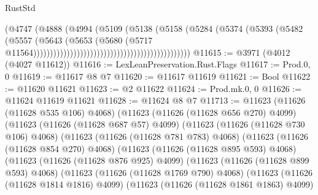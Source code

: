\begin{lexlean}{RustStd}
\begin{coremodule}
                                                                    (@4747
                                                                      (@4888
                                                                        (@4994
                                                                          (@5109
                                                                            (@5138
                                                                              (@5158
                                                                                (@5284
                                                                                  (@5374
                                                                                    (@5393
                                                                                      (@5482
                                                                                        (@5557
                                                                                          (@5643
                                                                                            (@5653
                                                                                              (@5680
                                                                                                (@5717
                                                                                                  @11564)))))))))))))))))))))))))))))))))))))))))))))))
@11615 := @3971 (@4012 (@4027 @11612))
@11616 := LexLeanPreservation.Rust.Flags
@11617 := Prod.{0, 0}
@11619 := @11617 @8 @7
@11620 := @11617 @11619
@11621 := Bool
@11622 := @11620 @11621
@11623 := @2 @11622
@11624 := Prod.mk.{0, 0}
@11626 := @11624 @11619 @11621
@11628 := @11624 @8 @7
@11713 := @11623
    (@11626 (@11628 @535 @106) @4068)
    (@11623
      (@11626 (@11628 @656 @270) @4099)
      (@11623
        (@11626 (@11628 @687 @57) @4099)
        (@11623
          (@11626 (@11628 @730 @106) @4068)
          (@11623
            (@11626 (@11628 @781 @783) @4068)
            (@11623
              (@11626 (@11628 @854 @270) @4068)
              (@11623
                (@11626 (@11628 @895 @593) @4068)
                (@11623
                  (@11626 (@11628 @876 @925) @4099)
                  (@11623
                    (@11626 (@11628 @899 @593) @4068)
                    (@11623
                      (@11626 (@11628 @1769 @790) @4068)
                      (@11623
                        (@11626 (@11628 @1814 @1816) @4099)
                        (@11623
                          (@11626 (@11628 @1861 @1863) @4099)

\end{coremodule}
\end{lexlean}
